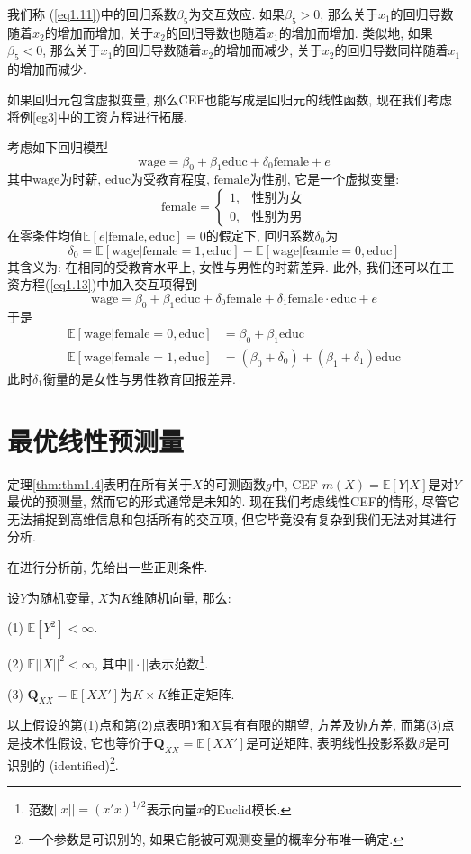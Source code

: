 \documentclass[cn, 12pt, math=mtpro2, bibstyle=apa, blue, twocol]{elegantbook}
\newcommand{\E}{\mathbb{E}}
\begin{document}
我们称 (\ref{eq1.11})中的回归系数$\beta_5$为交互效应. 如果$\beta_5>0$, 那么关于$x_1$的回归导数随着$x_2$的增加而增加, 关于$x_2$的回归导数也随着$x_1$的增加而增加. 类似地, 如果$\beta_5<0$, 那么关于$x_1$的回归导数随着$x_2$的增加而减少, 关于$x_2$的回归导数同样随着$x_1$的增加而减少.

如果回归元包含虚拟变量, 那么CEF也能写成是回归元的线性函数, 现在我们考虑将例\ref{eg3}中的工资方程进行拓展.

\begin{example}考虑如下回归模型
\begin{equation}\label{eq1.13}
  \text{wage}=\beta_0+\beta_1\text{educ}+\delta_0\text{female}+e
\end{equation}
其中$\text{wage}$为时薪, $\text{educ}$为受教育程度, $\text{female}$为性别, 它是一个虚拟变量:
$$\text{female}=\begin{cases}
                  1, & \text{性别为女} \\
                  0, & \text{性别为男}
                \end{cases}$$
在零条件均值$\E[e|\text{female}, \text{educ}]=0$的假定下, 回归系数$\delta_0$为
$$\delta_0=\E[\text{wage}|\text{female}=1, \text{educ}]-\E[\text{wage}|\text{feamle}=0,\text{educ}]$$
其含义为: 在相同的受教育水平上, 女性与男性的时薪差异. 此外, 我们还可以在工资方程(\ref{eq1.13})中加入交互项得到
$$\text{wage}=\beta_0+\beta_1\text{educ}+\delta_0\text{female}+\delta_1\text{female}\cdot\text{educ}+e$$
于是
\begin{align*}
\E[\text{wage}|\text{female}=0, \text{educ}]&=\beta_0+\beta_1\text{educ} \\
\E[\text{wage}|\text{female}=1, \text{educ}]&=(\beta_0+\delta_0)+(\beta_1+\delta_1)\text{educ}
\end{align*}
此时$\delta_1$衡量的是女性与男性教育回报差异.
\end{example}
\section{最优线性预测量}
定理\ref{thm:thm1.4}表明在所有关于$X$的可测函数$g$中, CEF $m(X)=\E[Y|X]$是对$Y$最优的预测量, 然而它的形式通常是未知的. 现在我们考虑线性CEF的情形, 尽管它无法捕捉到高维信息和包括所有的交互项, 但它毕竟没有复杂到我们无法对其进行分析.

在进行分析前, 先给出一些正则条件.
\begin{proposition}\label{pro:pro1.1}
设$Y$为随机变量, $X$为$K$维随机向量, 那么:

(1) $\E[Y^2]<\infty$.

(2) $\E||X||^2<\infty$, 其中$||\cdot||$表示范数\footnote{范数$||x||=(x'x)^{1/2}$表示向量$x$的Euclid模长.}.

(3) $\mathbold{Q}_{XX}=\E[XX']$为$K\times K$维正定矩阵.
\end{proposition}
以上假设的第(1)点和第(2)点表明$Y$和$X$具有有限的期望, 方差及协方差, 而第(3)点是技术性假设, 它也等价于$\mathbold{Q}_{XX}=\E[XX']$是可逆矩阵, 表明线性投影系数$\beta$是可识别的 (identified)\footnote{一个参数是可识别的, 如果它能被可观测变量的概率分布唯一确定.}.
\end{document}
